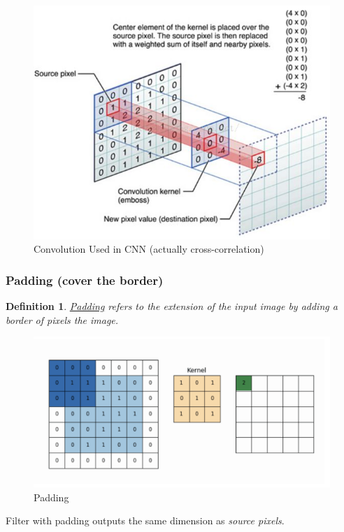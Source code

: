 \documentclass[11pt,a4paper]{article}
\newtheorem{definition}{Definition}
\begin{document}
\begin{center}\begin{figure}[htbp]
    \centering
    \includegraphics[scale=0.5]{convolution.jpeg}
    \caption{Convolution Used in CNN (actually cross-correlation)}
    \label{}
\end{figure}\end{center}

\subsubsection{Padding (cover the border)}
\begin{definition}
    \underline{Padding} refers to the extension of the input image by adding a border of pixels the image.
\end{definition}

\begin{center}\begin{figure}[htbp]
    \centering
    \includegraphics[scale=0.15]{Padding.png}
    \caption{Padding}
    \label{}
\end{figure}\end{center}
Filter with padding outputs the same dimension as \textit{source pixels}.
\end{document}
